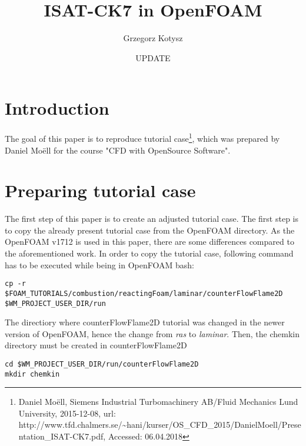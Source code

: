 \documentclass[12pt,english]{article}
\begin{document}
\title{ISAT-CK7 in OpenFOAM}


\author{Grzegorz Kotysz}


\date{UPDATE}

\maketitle
\newpage{}

\tableofcontents{}

\newpage{}

\section{Introduction}

The goal of this paper is to reproduce tutorial case\footnote{Daniel Moëll, Siemens Industrial Turbomachinery AB/Fluid Mechanics Lund University, 2015-12-08, url: http://www.tfd.chalmers.se/\~{}hani/kurser/OS\_CFD\_2015/DanielMoell/Presentation\_ISAT-CK7.pdf, Accessed: 06.04.2018}, which was prepared by Daniel Moëll for the course "CFD with OpenSource Software". 

\section{Preparing tutorial case}

The first step of this paper is to create an adjusted tutorial case. The first step is to copy the already present tutorial case from the OpenFOAM directory. As the OpenFOAM v1712 is used in this paper, there are some differences compared to the aforementioned work. In order to copy the tutorial case, following command has to be executed while being in OpenFOAM bash:
\begin{lstlisting}
cp -r 
$FOAM_TUTORIALS/combustion/reactingFoam/laminar/counterFlowFlame2D
$WM_PROJECT_USER_DIR/run
\end{lstlisting}

The directiory where counterFlowFlame2D tutorial was changed in the newer version of OpenFOAM, hence the change from \textit{ras} to \textit{laminar}. Then, the chemkin directory must be created in counterFlowFlame2D
\begin{lstlisting}
cd $WM_PROJECT_USER_DIR/run/counterFlowFlame2D
mkdir chemkin
\end{lstlisting}
\end{document}
